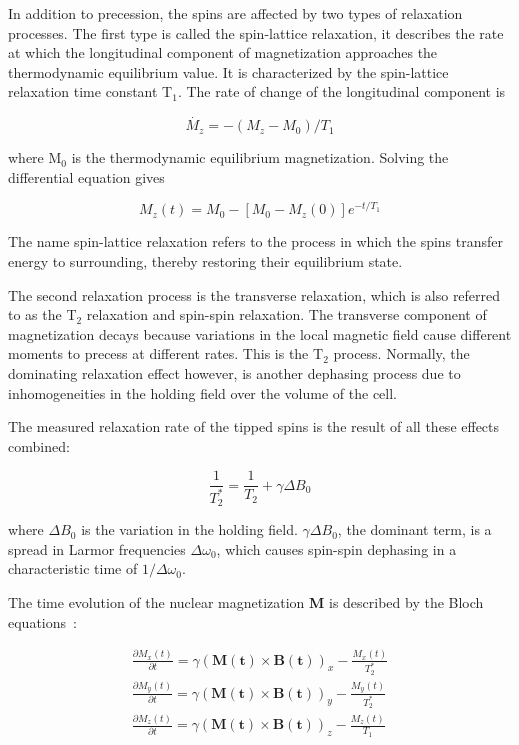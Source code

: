 In addition to precession, the spins are affected by two types of relaxation processes. The first type is called the spin-lattice relaxation, it describes the rate at which the longitudinal component of magnetization approaches the thermodynamic equilibrium value. It is characterized by the spin-lattice relaxation time constant T$_{1}$. The rate of change of the longitudinal component is

\begin{equation}
\dot{M_{z}}=-(M_{z}-M_{0})/T_{1}
\end{equation}

where M$_{0}$ is the thermodynamic equilibrium magnetization. Solving the differential equation gives

\begin{equation}
M_{z}(t)=M_{0}-\left[M_{0}-M_{z}(0)\right]e^{-t/T_{1}}
\end{equation}

The name spin-lattice relaxation refers to the process in which the spins transfer energy to surrounding, thereby restoring their equilibrium state.

The second relaxation process is the transverse relaxation, which is also referred to as the T$_{2}$ relaxation and spin-spin relaxation. The transverse component of magnetization decays because variations in the local magnetic field cause different moments to precess at different rates. This is the T$_{2}$ process. Normally, the dominating relaxation effect however, is another dephasing process due to inhomogeneities in the holding field over the volume of the cell. 

The measured relaxation rate of the tipped spins is the result of all these effects combined:

\begin{equation}
\frac{1}{T_{2}^{*}}=\frac{1}{T_{2}}+\gamma \Delta B_{0}
\end{equation}

where $\Delta B_{0}$ is the variation in the holding field. $\gamma \Delta B_{0}$, the dominant term, is a spread in Larmor frequencies $\Delta \omega_{0}$, which causes spin-spin dephasing in a characteristic time of $1/\Delta \omega_{0}$. 

The time evolution of the nuclear magnetization {\bf M} is described by the Bloch equations~\cite{PhysRev.70.460}:

\begin{subequations}
	\begin{gather}
	\frac{\partial M_{x}(t)}{\partial t}=\gamma\left(\boldsymbol{M(t)}\times \boldsymbol{B(t)}\right)_{x}-\frac{M_{x}(t)}{T_{2}^{*}}\\
	\frac{\partial M_{y}(t)}{\partial t}=\gamma\left(\boldsymbol{M(t)}\times \boldsymbol{B(t)}\right)_{y}-\frac{M_{y}(t)}{T_{2}^{*}}\\
	\frac{\partial M_{z}(t)}{\partial t}=\gamma\left(\boldsymbol{M(t)}\times \boldsymbol{B(t)}\right)_{z}-\frac{M_{z}(t)}{T_{1}}
	\end{gather}
\end{subequations}

